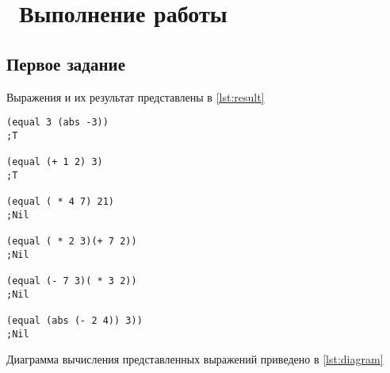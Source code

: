 \chapter{ Выполнение работы}
\label{cha:analysis}

\section{ Первое задание}

Выражения и их результат представлены в \ref{lst:result}

\begin{lstlisting}[style=lispStyle, caption={ Выражения и их результат},
                    label={lst:result}]
(equal 3 (abs -3))
;T

(equal (+ 1 2) 3)
;T

(equal ( * 4 7) 21)
;Nil

(equal ( * 2 3)(+ 7 2))
;Nil

(equal (- 7 3)( * 3 2))
;Nil

(equal (abs (- 2 4)) 3))
;Nil
\end{lstlisting}

Диаграмма вычисления представленных выражений приведено в \ref{lst:diagram}

